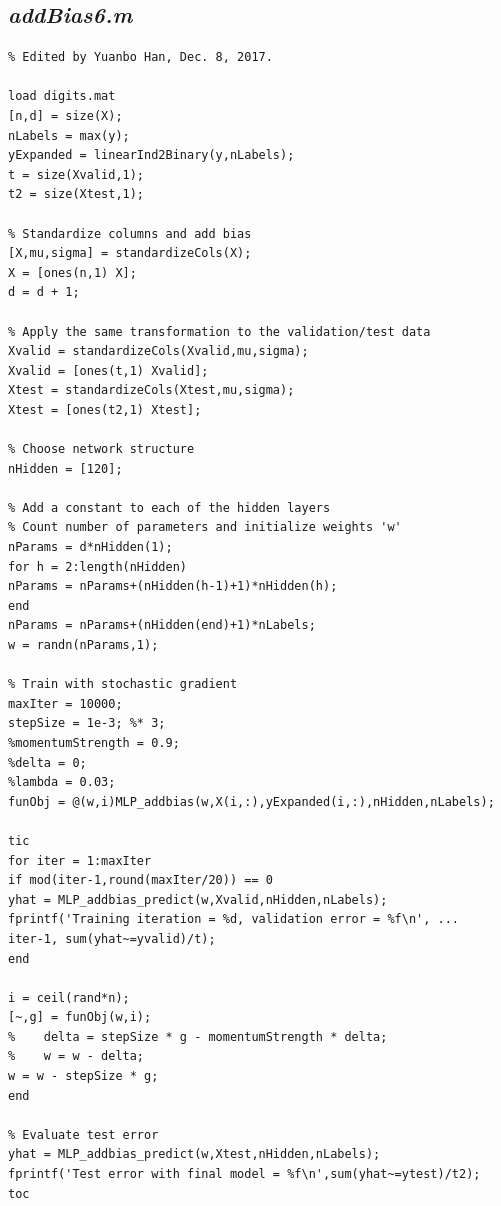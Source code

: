 \documentclass{article}
\begin{document}
\subsection{\emph{addBias6.m}}
\begin{lstlisting}
% Edited by Yuanbo Han, Dec. 8, 2017.

load digits.mat
[n,d] = size(X);
nLabels = max(y);
yExpanded = linearInd2Binary(y,nLabels);
t = size(Xvalid,1);
t2 = size(Xtest,1);

% Standardize columns and add bias
[X,mu,sigma] = standardizeCols(X);
X = [ones(n,1) X];
d = d + 1;

% Apply the same transformation to the validation/test data
Xvalid = standardizeCols(Xvalid,mu,sigma);
Xvalid = [ones(t,1) Xvalid];
Xtest = standardizeCols(Xtest,mu,sigma);
Xtest = [ones(t2,1) Xtest];

% Choose network structure
nHidden = [120];

% Add a constant to each of the hidden layers
% Count number of parameters and initialize weights 'w'
nParams = d*nHidden(1);
for h = 2:length(nHidden)
nParams = nParams+(nHidden(h-1)+1)*nHidden(h);
end
nParams = nParams+(nHidden(end)+1)*nLabels;
w = randn(nParams,1);

% Train with stochastic gradient
maxIter = 10000;
stepSize = 1e-3; %* 3;
%momentumStrength = 0.9;
%delta = 0;
%lambda = 0.03;
funObj = @(w,i)MLP_addbias(w,X(i,:),yExpanded(i,:),nHidden,nLabels);

tic
for iter = 1:maxIter
if mod(iter-1,round(maxIter/20)) == 0
yhat = MLP_addbias_predict(w,Xvalid,nHidden,nLabels);
fprintf('Training iteration = %d, validation error = %f\n', ...
iter-1, sum(yhat~=yvalid)/t);
end

i = ceil(rand*n);
[~,g] = funObj(w,i);
%    delta = stepSize * g - momentumStrength * delta;
%    w = w - delta;
w = w - stepSize * g;
end

% Evaluate test error
yhat = MLP_addbias_predict(w,Xtest,nHidden,nLabels);
fprintf('Test error with final model = %f\n',sum(yhat~=ytest)/t2);
toc
\end{lstlisting}
\end{document}
